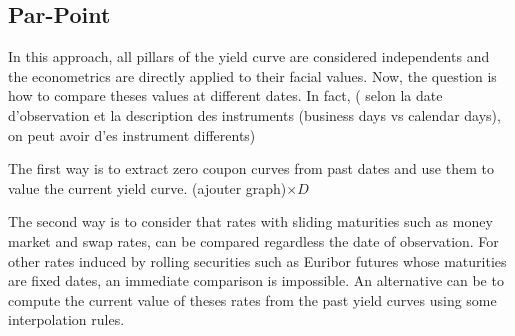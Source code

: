 \documentclass[3pt]{article}
\begin{document}
\subsection{Par-Point}

In this approach, all pillars of the yield curve are considered independents
and the econometrics are directly applied to their facial values. Now, the
question is how to compare theses values at different dates. In fact, (
selon la date d'observation et la description des instruments (business days
vs calendar days), on peut avoir d'es instrument differents)

\bigskip

The first way is to extract zero coupon curves from past dates and use them
to value the current yield curve. (ajouter graph)$\times D$

\bigskip

\bigskip

\bigskip

The second way is to consider that rates with sliding maturities such as
money market and swap rates, can be compared regardless the date of
observation. For other rates induced by rolling securities such as Euribor
futures whose maturities are fixed dates, an immediate comparison is
impossible. An alternative can be to compute the current value of theses
rates from the past yield curves using some interpolation rules.

\bigskip 

\bigskip 

\bigskip 

\bigskip 

\bigskip 

\bigskip 

\bigskip 

\bigskip 

\bigskip 

\bigskip 

\bigskip 

\bigskip 

\bigskip 

\bigskip 

\bigskip 

\bigskip 

\bigskip 

\bigskip 

\bigskip 

\bigskip 

\bigskip 

\bigskip 

\bigskip 
\end{document}
